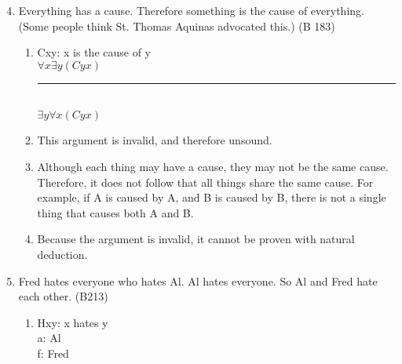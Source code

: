 \documentclass{article}
\begin{document}
\begin{enumerate}
      \setcounter{enumi}{3}
      \item Everything has a cause. Therefore something is the cause of everything. (Some people think St. Thomas Aquinas advocated this.) (B 183)
            \begin{enumerate}
                  \item Cxy: x is the cause of y\\

                        $\forall x \exists y(Cyx)$\\
                        \rule{15em}{.5pt}\\
                        $\exists y \forall x(Cyx)$
                  \item This argument is invalid, and therefore unsound.
                  \item Although each thing may have a cause, they may not be the same cause. Therefore, it does not follow that all things share the same cause. For example, if A is caused by A, and B is caused by B, there is not a single thing that causes both A and B.
                  \item Because the argument is invalid, it cannot be proven with natural deduction.
            \end{enumerate}
      \item Fred hates everyone who hates Al. Al hates everyone. So Al and Fred hate each other. (B213)
            \begin{enumerate}
                  \item Hxy: x hates y\\
                        a: Al\\
                        f: Fred\\


\end{enumerate}
\end{enumerate}
\end{document}

